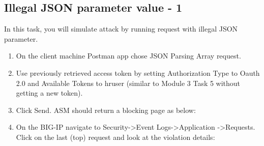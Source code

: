 \documentclass[letterpaper,10pt,english]{sphinxmanual}
\begin{document}
\subsection{Illegal JSON parameter value - 1}
\label{\detokenize{class1/module4/module4:illegal-json-parameter-value-1}}
In this task, you will simulate attack by running request with illegal
JSON parameter.
\begin{enumerate}
\item {} 
On the client machine Postman app chose JSON Parsing Array request.

\item {} 
Use previously retrieved access token by setting Authorization Type
to Oauth 2.0 and Available Tokens to hruser (similar to Module 3 Task
5 without getting a new token).

\item {} 
Click Send. ASM should return a blocking page as below:

\end{enumerate}
\begin{quote}

\noindent{}
\end{quote}
\begin{enumerate}
\setcounter{enumi}{3}
\item {} 
On the BIG-IP navigate to Security-\textgreater{}Event Logs-\textgreater{}Application
-\textgreater{}Requests. Click on the last (top) request and look at the violation
details:

\end{enumerate}
\begin{quote}

\noindent{}
\end{quote}
\end{document}

